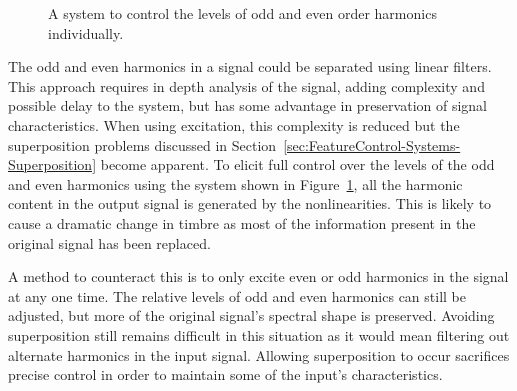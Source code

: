 \begin{figure}[h!]
			\caption{A system to control the levels of odd and even order harmonics individually.}
			\label{fig:HarmonicParitySystem}
		\end{figure}

		The odd and even harmonics in a signal could be separated using linear filters. This approach requires in
		depth analysis of the signal, adding complexity and possible delay to the system, but has some advantage in
		preservation of signal characteristics. When using excitation, this complexity is reduced but the
		superposition problems discussed in Section~\ref{sec:FeatureControl-Systems-Superposition} become apparent.
		To elicit full control over the levels of the odd and even harmonics using the system shown in
		Figure~\ref{fig:HarmonicParitySystem}, all the harmonic content in the output signal is generated by the
		nonlinearities. This is likely to cause a dramatic change in timbre as most of the information present in
		the original signal has been replaced. 

		A method to counteract this is to only excite even or odd harmonics in the signal at any one time.  The
		relative levels of odd and even harmonics can still be adjusted, but more of the original signal's spectral
		shape is preserved. Avoiding superposition still remains difficult in this situation as it would mean
		filtering out alternate harmonics in the input signal. Allowing superposition to occur sacrifices precise
		control in order to maintain some of the input's characteristics.

